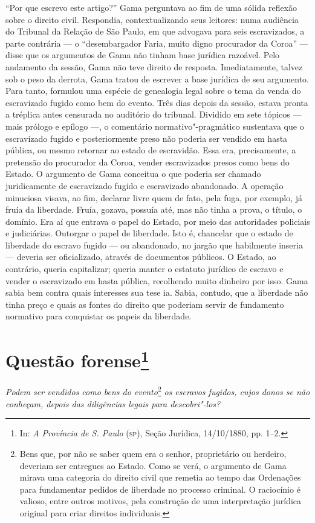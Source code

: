 {\small\noindent
``Por que escrevo este artigo?''
Gama perguntava ao fim de uma sólida reflexão sobre o direito civil.
Respondia, contextualizando seus leitores: numa audiência do
Tribunal da Relação de São Paulo, em que advogava para seis
escravizados, a parte contrária --- o ``desembargador Faria, muito digno
procurador da Coroa'' --- disse que os argumentos de Gama não tinham base
jurídica razoável. Pelo andamento da sessão, Gama não teve direito de
resposta. Imediatamente, talvez sob o peso da derrota, Gama tratou de
escrever a base jurídica de seu argumento. Para tanto, formulou uma
espécie de genealogia legal sobre o tema da venda do escravizado fugido
como bem do evento. Três dias depois da sessão, estava pronta a tréplica
antes censurada no auditório do tribunal. Dividido em sete tópicos ---
mais prólogo e epílogo ---, o comentário normativo"-pragmático sustentava
que o escravizado fugido e posteriormente preso não poderia ser vendido
em hasta pública, ou mesmo retornar ao estado de escravidão. Essa era,
precisamente, a pretensão do procurador da Coroa, vender escravizados
presos como bens do Estado. O argumento de Gama conceitua o que poderia
ser chamado juridicamente de escravizado fugido e escravizado
abandonado. A operação minuciosa visava, ao fim, declarar livre quem de
fato, pela fuga, por exemplo, já fruía da liberdade. Fruía, gozava,
possuía até, mas não tinha a prova, o título, o domínio. Era aí que
entrava o papel do Estado, por meio das autoridades policiais e
judiciárias. Outorgar o papel de liberdade. Isto é, chancelar que o
estado de liberdade do escravo fugido --- ou abandonado, no jargão que
habilmente inseria --- deveria ser oficializado, através de documentos
públicos. O Estado, ao contrário, queria capitalizar; queria manter o
estatuto jurídico de escravo e vender o escravizado em hasta pública,
recolhendo muito dinheiro por isso. Gama sabia bem contra quais
interesses sua tese ia. Sabia, contudo, que a liberdade não tinha preço
e quais as fontes do direito que poderiam servir de fundamento normativo
para conquistar os papeis da liberdade.}

\chapter{Questão forense\footnote[*]{In: \emph{A Província de S.
  Paulo} (\textsc{sp}), Seção Jurídica, 14/10/1880, pp. 1--2.}}


\emph{Podem ser vendidos como bens do evento}\footnote{Bens que, por
  não se saber quem era o senhor, proprietário ou herdeiro, deveriam ser
  entregues ao Estado. Como se verá, o argumento de Gama mirava uma
  categoria do direito civil que remetia ao tempo das Ordenações para
  fundamentar pedidos de liberdade no processo criminal. O raciocínio é
  valioso, entre outros motivos, pela construção de uma interpretação
  jurídica original para criar direitos individuais.} \emph{os escravos
fugidos, cujos donos se não conheçam, depois das diligências legais para
descobri"-los?}

